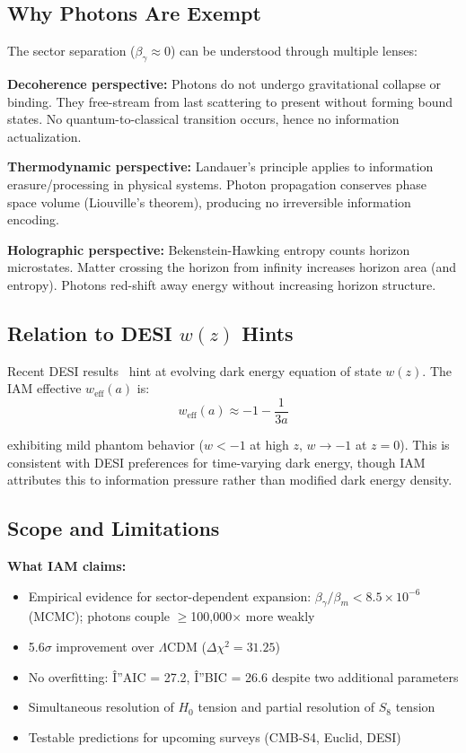 \documentclass[twocolumn,superscriptaddress,prl,amsmath,amssymb]{revtex4-2}
\begin{document}
\subsection{Why Photons Are Exempt}

The sector separation ($\beta_\gamma \approx 0$) can be understood through multiple lenses:

\textbf{Decoherence perspective:} Photons do not undergo gravitational collapse or binding. They free-stream from last scattering to present without forming bound states. No quantum-to-classical transition occurs, hence no information actualization.

\textbf{Thermodynamic perspective:} Landauer's principle applies to information erasure/processing in physical systems. Photon propagation conserves phase space volume (Liouville's theorem), producing no irreversible information encoding.

\textbf{Holographic perspective:} Bekenstein-Hawking entropy counts horizon microstates. Matter crossing the horizon from infinity increases horizon area (and entropy). Photons red-shift away energy without increasing horizon structure.

\subsection{Relation to DESI $w(z)$ Hints}

Recent DESI results~\cite{DESI2024} hint at evolving dark energy equation of state $w(z)$. The IAM effective $w_{\text{eff}}(a)$ is:
\begin{equation}
w_{\text{eff}}(a) \approx -1 - \frac{1}{3a}
\end{equation}

exhibiting mild phantom behavior ($w < -1$ at high $z$, $w \to -1$ at $z=0$). This is consistent with DESI preferences for time-varying dark energy, though IAM attributes this to information pressure rather than modified dark energy density.

\subsection{Scope and Limitations}

\textbf{What IAM claims:}
\begin{itemize}
\item Empirical evidence for sector-dependent expansion: $\beta_\gamma/\beta_m < 8.5 \times 10^{-6}$ (MCMC); photons couple $\geq$100,000$\times$ more weakly
\item 5.6$\sigma$ improvement over $\Lambda$CDM ($\Delta\chi^2 = 31.25$)
\item No overfitting: Î”AIC = 27.2, Î”BIC = 26.6 despite two additional parameters
\item Simultaneous resolution of $H_0$ tension and partial resolution of $S_8$ tension
\item Testable predictions for upcoming surveys (CMB-S4, Euclid, DESI)
\end{itemize}
\end{document}
